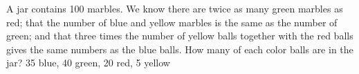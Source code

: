 {A jar contains 100 marbles. We know there are twice as many green marbles as red; that the number of blue and yellow marbles is the same as the number of green; and that three times the number of yellow balls together with the red balls gives the same numbers as the blue balls. How many of each color balls are in the jar?}
{35 blue, 40 green, 20 red, 5 yellow}